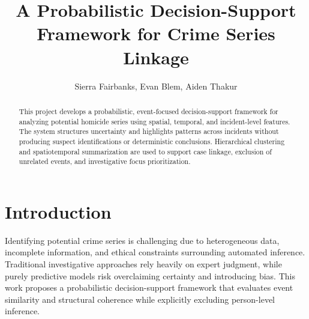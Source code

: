 \documentclass[12pt]{article}
\title{A Probabilistic Decision-Support Framework for Crime Series Linkage}
\author{Sierra Fairbanks, Evan Blem, Aiden Thakur}
\date{}
\begin{document}
\maketitle

\begin{abstract}
This project develops a probabilistic, event-focused decision-support framework for analyzing potential homicide series using spatial, temporal, and incident-level features. The system structures uncertainty and highlights patterns across incidents without producing suspect identifications or deterministic conclusions. Hierarchical clustering and spatiotemporal summarization are used to support case linkage, exclusion of unrelated events, and investigative focus prioritization.
\end{abstract}

\section{Introduction}
Identifying potential crime series is challenging due to heterogeneous data, incomplete information, and ethical constraints surrounding automated inference. Traditional investigative approaches rely heavily on expert judgment, while purely predictive models risk overclaiming certainty and introducing bias. This work proposes a probabilistic decision-support framework that evaluates event similarity and structural coherence while explicitly excluding person-level inference.
\end{document}
